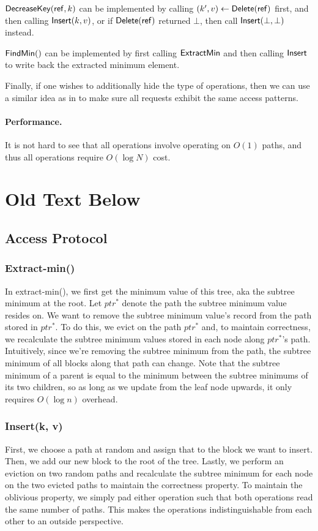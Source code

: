 \documentclass[11pt]{article}
\begin{document}
${\sf DecreaseKey}({\sf ref}, k)$
can be implemented 
by calling $(k', v) \leftarrow {\sf Delete}({\sf ref})$ 
first, and then 
calling ${\sf Insert}(k, v)$, or  
if ${\sf Delete}({\sf ref})$ returned $\bot$, then call 
${\sf Insert}(\bot, \bot)$ instead.  

${\sf FindMin}()$
can be implemented by first calling ${\sf ExtractMin}$
and then calling ${\sf Insert}$ to write back the extracted minimum element.

Finally, if one wishes to additionally hide
the type of operations, 
then we can 
use a similar idea as in 
to make sure all requests 
exhibit the same access patterns.

\paragraph{Performance.}
It is not hard to see that all operations
involve operating on $O(1)$ paths, and thus 
all operations require $O(\log N)$ cost. 


\section{Old Text Below}

\subsection{Access Protocol}

\subsubsection{Extract-min()}
In extract-min(), we first get the minimum value of this tree, aka the subtree minimum at the root. Let $ptr^*$ denote the path the subtree minimum value resides on. We want to remove the subtree minimum value's record from the path stored in $ptr^*$. To do this, we evict on the path $ptr^*$ and, to maintain correctness, we recalculate the subtree minimum values stored in each node along $ptr^*$'s path. Intuitively, since we're removing the subtree minimum from the path, the subtree minimum of all blocks along that path can change. Note that the subtree minimum of a parent is equal to the minimum between the subtree minimums of its two children, so as long as we update from the leaf node upwards, it only requires $O(\log n)$ overhead.


\subsubsection{Insert(k, v)}
First, we choose a path at random and assign that to the block we want to insert. Then, we add our new block to the root of the tree. Lastly, we perform an eviction on two random paths and recalculate the subtree minimum for each node on the two evicted paths to maintain the correctness property. To maintain the oblivious property, we simply pad either operation such that both operations read the same number of paths. This makes the operations indistinguishable from each other to an outside perspective.
\end{document}
